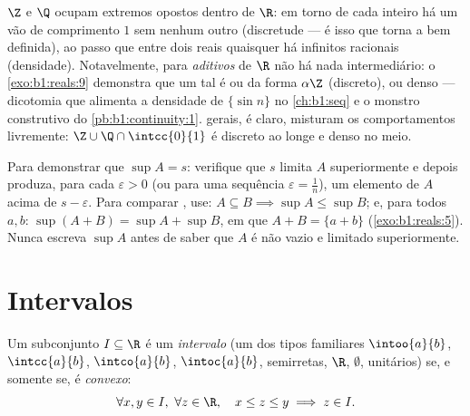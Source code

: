 \begin{remark}
$\Z$ e $\Q$ ocupam extremos opostos dentro de $\R$: em torno de cada
inteiro há um vão de comprimento $1$ sem nenhum outro
(discretude --- é isso que torna a  bem definida),
ao passo que entre dois reais quaisquer há infinitos racionais
(densidade). Notavelmente, para \emph{ aditivos} de $\R$
não há nada intermediário: o \cref{exo:b1:reals:9} demonstra que
um tal  é ou da forma $\alpha\Z$ (discreto), ou
denso --- dicotomia que alimenta a densidade de $\{\sin n\}$ no
\cref{ch:b1:seq} e o monstro construtivo do
\cref{pb:b1:continuity:1}.  gerais, é claro, misturam os
comportamentos livremente: $\Z \cup \Q\cap\intcc{0}{1}$ é discreto ao longe
e denso no meio.
\end{remark}

\begin{method}\label{met:b1:reals:supproofs}
Para demonstrar que $\sup A = s$: verifique que $s$ limita $A$ superiormente
e depois produza, para cada $\varepsilon > 0$ (ou para uma sequência $\varepsilon = \frac
1n$), um elemento de $A$ acima de $s - \varepsilon$. Para comparar
, use: $A \subseteq B \implies \sup A \leq \sup B$; e, para todos $a, b$:
$\sup(A + B) = \sup A + \sup B$, em que $A + B = \{a + b\}$
(\cref{exo:b1:reals:5}). Nunca escreva $\sup A$ antes de saber que $A$ é
não vazio e limitado superiormente.
\end{method}

\section{Intervalos}

\begin{proposition}\label{prop:b1:reals:intervals}
Um subconjunto $I \subseteq \R$ é um \emph{intervalo} (um
dos tipos familiares $\intoo{a}{b}$, $\intcc{a}{b}$, $\intco{a}{b}$,
$\intoc{a}{b}$, semirretas, $\R$, $\emptyset$,  unitários) se, e
somente se, é \emph{convexo}:
\[
\forall x, y \in I,\ \forall z \in \R, \quad
x \leq z \leq y \implies z \in I .
\]
\end{proposition}

